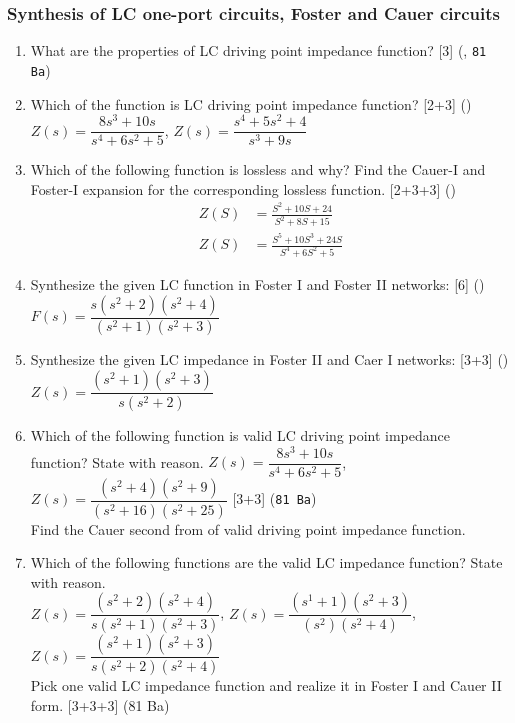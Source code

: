 \documentclass[12pt]{article}
\begin{document}
\subsubsection{Synthesis of LC one-port circuits, Foster and Cauer circuits}
\begin{enumerate}
	\item What are the properties of LC driving point impedance function? \hfill [3] (, \texttt{81 Ba})
	
	\item Which of the function is LC driving point impedance function? \hfill [2+3] ()\\
	$Z(s) = \dfrac{8s^3+10s}{s^4+6s^2+5}$, \hspace{1cm} $Z(s) = \dfrac{s^4+5s^2+4}{s^3+9s}$

	\item Which of the following function is lossless and why? Find the Cauer-I and Foster-I expansion for the corresponding lossless function. \hfill [2+3+3] ()
\begin{align*}
Z(S) &= \frac{S^2+10S+24}{S^2+8S+15}\\
Z(S) &= \frac{S^5+10S^3+24S}{S^4+6S^2+5}
\end{align*}

	\item Synthesize the given LC function in Foster I and Foster II networks: \hfill [6] ()\\
	$F(s) = \dfrac{s(s^2+2)(s^2+4)}{(s^2+1)(s^2+3)}$
	
	\item Synthesize the given LC impedance in Foster II and Caer I networks: \hfill [3+3] ()\\
	$Z(s) = \dfrac{(s^2+1)(s^2+3)}{s(s^2+2)}$
	
	\item Which of the following function is valid LC driving point impedance function? State with reason.
$Z(s) = \dfrac{8s^3+10s}{s^4+6s^2+5}$,\hspace*{1cm}    $Z(s) = \dfrac{(s^2+4)(s^2+9)}{(s^2+16)(s^2+25)}$ \hfill [3+3] (\texttt{81 Ba})\\
Find the Cauer second from of valid driving point impedance function.
	
	\item Which of the following functions are the valid LC impedance function? State with reason.\\
	$Z(s) = \dfrac{(s^2+2)(s^2+4)}{s(s^2+1)(s^2+3)}$, \hspace{1cm} $Z(s) = \dfrac{(s^1+1)(s^2+3)}{(s^2)(s^2+4)}$, \hspace{1cm} $Z(s) = \dfrac{(s^2+1)(s^2+3)}{s(s^2+2)(s^2+4)}$\\
	Pick one valid LC impedance function and realize it in Foster I and Cauer II form. \hfill [3+3+3] (81 Ba)
	

\end{enumerate}
\end{document}
